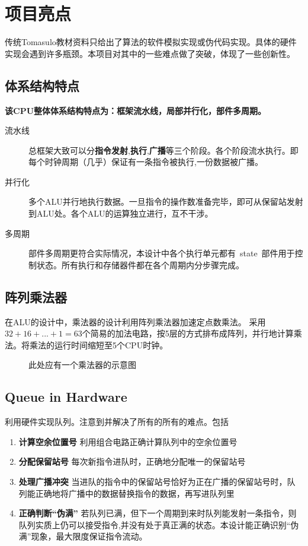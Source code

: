 \documentclass[twoside]{article}
\begin{document}
\section{项目亮点}
传统Tomasulo教材资料只给出了算法的软件模拟实现或伪代码实现。具体的硬件实现会遇到许多瓶颈。本项目对其中的一些难点做了突破，体现了一些创新性。
\subsection{体系结构特点}
\textbf{该CPU整体体系结构特点为：框架流水线，局部并行化，部件多周期。}  
\begin{description}
	\item[流水线] 总框架大致可以分\textbf{指令发射},\textbf{执行},\textbf{广播}等三个阶段。各个阶段流水执行。即每个时钟周期（几乎）保证有一条指令被执行,一份数据被广播。
	\item[并行化] 多个ALU并行地执行数据。一旦指令的操作数准备完毕，即可从保留站发射到ALU处。各个ALU的运算独立进行，互不干涉。
	\item[多周期] 部件多周期更符合实际情况，本设计中各个执行单元都有~state~部件用于控制状态。所有执行和存储器件都在各个周期内分步骤完成。
\end{description}

\subsection{阵列乘法器}
在ALU的设计中，乘法器的设计利用阵列乘法器加速定点数乘法。  
采用$32 + 16 +... +1=63$个简易的加法电路，按5层的方式排布成阵列，并行地计算乘法。将乘法的运行时间缩短至5个CPU时钟。


\begin{figure}[!hbp]
\makebox[\textwidth]{\framebox[5cm]{\rule{0pt}{5cm}}}
\caption{此处应有一个乘法器的示意图}
\label{fig:temp1}
\end{figure}

\subsection{Queue in Hardware}
利用硬件实现队列。注意到并解决了所有的所有的难点。包括 
\begin{enumerate}
	\item \textbf{计算空余位置号   }利用组合电路正确计算队列中的空余位置号
	\item \textbf{分配保留站号   } 每次新指令进队时，正确地分配唯一的保留站号
	\item \textbf{处理广播冲突   }当进队的指令中的保留站号恰好为正在广播的保留站号时，队列能正确地将广播中的数据替换指令的数据，再写进队列里
	\item \textbf{正确判断“伪满”   }若队列已满，但下一个周期到来时队列能发射一条指令，则队列实质上仍可以接受指令,并没有处于真正满的状态。本设计能正确识别“伪满”现象，最大限度保证指令流动。
\end{enumerate} 
  
\end{document}
